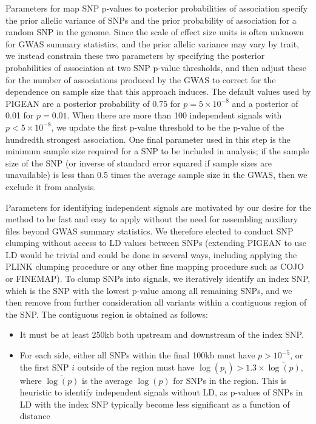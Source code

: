 {Parameters for map SNP
p-values to posterior probabilities of association specify the prior allelic variance of SNPs\cite{} and the prior
probability of association for a random SNP in the genome. Since the
scale of effect size units is often unknown for GWAS summary
statistics, and the prior allelic variance may vary by trait, we
instead constrain these two parameters by specifying the posterior
probabilities of association at two SNP p-value thresholds, and then
adjust these for the number of associations produced by the GWAS to
correct for the dependence on sample size that this approach
induces\cite{}. The default values used by PIGEAN are a posterior
probability of 0.75 for $p=5\times10^{-8}$ and a posterior of 0.01 for
$p=0.01$. When there are more than 100 independent signals with
$p<5\times10^{-8}$, we update the first p-value threshold to be the
p-value of the hundredth strongest association. One final parameter
used in this step is the minimum sample size required for a SNP to be
included in analysis; if the sample size of the SNP (or inverse of
standard error squared
if sample sizes are unavailable) is less than 0.5 times the average
sample size in the GWAS, then we exclude it from analysis.

Parameters for identifying independent
signals are motivated by our desire for the method to be fast and easy
to apply without the need for assembling auxiliary files beyond GWAS
summary statistics. We therefore elected to conduct SNP clumping 
without access to LD values between SNPs (extending PIGEAN to use LD
would be trivial and could be done in several ways, including applying
the PLINK clumping procedure\cite{} or any other fine mapping
procedure such as COJO\cite{} or FINEMAP\cite{}). To clump SNPs into signals, we
iteratively identify an index SNP, which is the SNP with the lowest
p-value among all remaining SNPs, and we then remove from further consideration
all variants within a contiguous region of the SNP. The contiguous
region is obtained as follows:
\begin{itemize}
  \item It must be at least 250kb both upstream and downstream of the
    index SNP.
 \item For each side, either all SNPs within the final 100kb must have $p>10^{-5}$, or
    the first SNP $i$ outside of the region must have $\log(p_i) > 1.3 \times
    \overline{\log(p)}$, where $\overline{\log(p)}$ is the average
    $\log(p)$ for SNPs in the region. This is heuristic to identify independent signals
    without LD, as p-values of SNPs in LD with the index SNP typically
    become less significant as a function of distance
\end{itemize}

}
